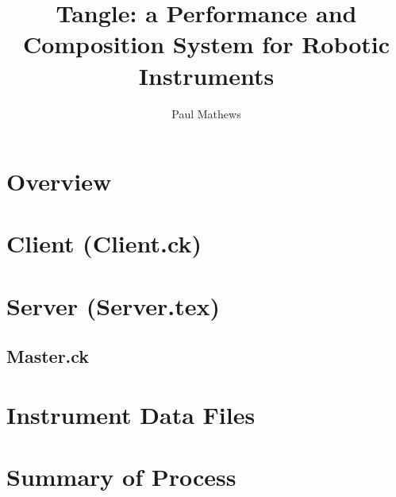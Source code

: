 \documentclass[11pt]{article}
\title{Tangle: a Performance and Composition System for Robotic Instruments}
\author{Paul Mathews}
\begin{document}
\maketitle

\section{Overview}


\section{Client (Client.ck)}


\section{Server (Server.tex)}

\subsection{Master.ck}


\section{Instrument Data Files}


\section{Summary of Process}

\end{document}
